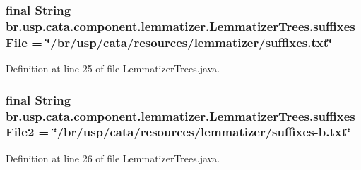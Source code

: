 \hypertarget{classbr_1_1usp_1_1cata_1_1component_1_1lemmatizer_1_1_lemmatizer_trees_a04bbb41c672505518cb686410bcaa81e}{
\subsubsection[{suffixes\+File}]{\setlength{\rightskip}{0pt plus 5cm}final String br.\+usp.\+cata.\+component.\+lemmatizer.\+Lemmatizer\+Trees.\+suffixes\+File = \char`\"{}/br/usp/cata/resources/lemmatizer/suffixes.\+txt\char`\"{}\hspace{0.3cm}{\ttfamily [private]}}}\label{classbr_1_1usp_1_1cata_1_1component_1_1lemmatizer_1_1_lemmatizer_trees_a04bbb41c672505518cb686410bcaa81e}


Definition at line 25 of file Lemmatizer\+Trees.\+java.

\hypertarget{classbr_1_1usp_1_1cata_1_1component_1_1lemmatizer_1_1_lemmatizer_trees_af4645525b8813e134fae84ed656b42cd}{
\subsubsection[{suffixes\+File2}]{\setlength{\rightskip}{0pt plus 5cm}final String br.\+usp.\+cata.\+component.\+lemmatizer.\+Lemmatizer\+Trees.\+suffixes\+File2 = \char`\"{}/br/usp/cata/resources/lemmatizer/suffixes-\/b.\+txt\char`\"{}\hspace{0.3cm}{\ttfamily [private]}}}\label{classbr_1_1usp_1_1cata_1_1component_1_1lemmatizer_1_1_lemmatizer_trees_af4645525b8813e134fae84ed656b42cd}


Definition at line 26 of file Lemmatizer\+Trees.\+java.

